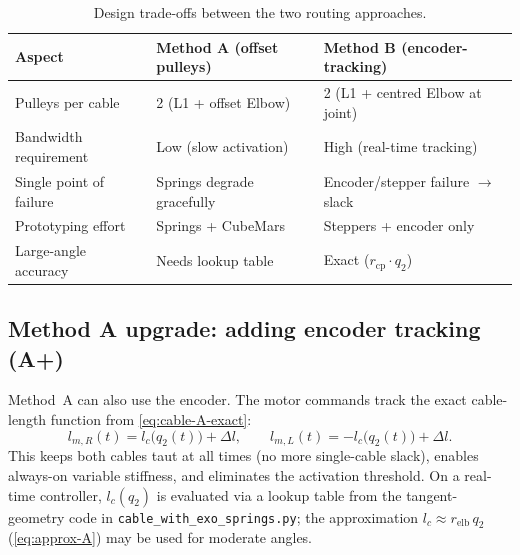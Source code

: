 \documentclass[11pt, a4paper]{article}
\begin{document}
\begin{table}[h]
\centering
\begin{tabular}{@{}lll@{}}
\toprule
\textbf{Aspect}
    & \textbf{Method A (offset pulleys)}
    & \textbf{Method B (encoder-tracking)} \\
\midrule
Pulleys per cable
    & 2 (L1 + offset Elbow)
    & 2 (L1 + centred Elbow at joint) \\
Bandwidth requirement
    & Low (slow activation)
    & High (real-time tracking) \\
Single point of failure
    & Springs degrade gracefully
    & Encoder/stepper failure $\to$ slack \\
Prototyping effort
    & Springs + CubeMars
    & Steppers + encoder only \\
Large-angle accuracy
    & Needs lookup table
    & Exact ($r_{\text{cp}} \cdot q_2$) \\
\bottomrule
\end{tabular}
\caption{Design trade-offs between the two routing approaches.}
\label{tab:tradeoff}
\end{table}

\subsection{Method A upgrade: adding encoder tracking (A+)}
\label{sec:encoder-upgrade}

Method~A can also use the encoder.  The motor commands track the
exact cable-length function from \eqref{eq:cable-A-exact}:
%
\begin{equation}\label{eq:encoder-A}
    l_{m,R}(t) = l_c\bigl(q_2(t)\bigr) + \Delta l, \qquad
    l_{m,L}(t) = -l_c\bigl(q_2(t)\bigr) + \Delta l.
\end{equation}
%
This keeps both cables taut at all times (no more single-cable slack),
enables always-on variable stiffness, and eliminates the activation
threshold.  On a real-time controller, $l_c(q_2)$ is evaluated via a
lookup table from the tangent-geometry code in
\texttt{cable\_with\_exo\_springs.py}; the approximation
$l_c \approx r_{\text{elb}}\,q_2$ (\cref{eq:approx-A}) may be used for
moderate angles.
\end{document}
